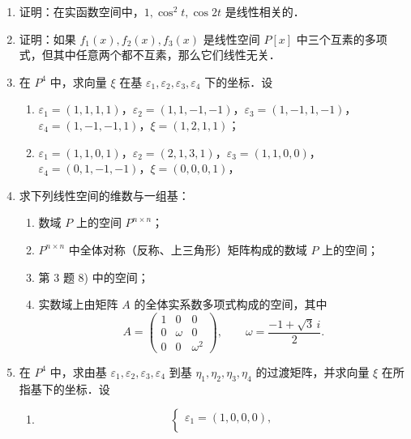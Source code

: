 \begin{enumerate}
  \begin{enumerate}
    \item $k0=0$；
  \anssub
    \item $k(\alpha-\beta)=k\alpha-k\beta$.
  \anssub
  \end{enumerate}
  \item 证明：在实函数空间中，$1,\cos^2 t,\cos 2t$ 是线性相关的．
  \ansproof
  \item 证明：如果 $f_1(x),f_2(x),f_3(x)$ 是线性空间 $P[x]$ 中三个互素的多项式，但其中任意两个都不互素，那么它们线性无关．
  \ansproof
  \item 在 $P^4$ 中，求向量 $\xi$ 在基 $\varepsilon_1,\varepsilon_2,\varepsilon_3,\varepsilon_4$ 下的坐标．设
  \begin{enumerate}
    \item $\varepsilon_1=(1,1,1,1)$，$\varepsilon_2=(1,1,-1,-1)$，$\varepsilon_3=(1,-1,1,-1)$，$\varepsilon_4=(1,-1,-1,1)$，$\xi=(1,2,1,1)$；
  \anssub
    \item $\varepsilon_1=(1,1,0,1)$，$\varepsilon_2=(2,1,3,1)$，$\varepsilon_3=(1,1,0,0)$，$\varepsilon_4=(0,1,-1,-1)$，$\xi=(0,0,0,1)$，
  \anssub
  \end{enumerate}
  \item 求下列线性空间的维数与一组基：
  \begin{enumerate}
    \item 数域 $P$ 上的空间 $P^{n\times n}$；
  \anssub
    \item $P^{n\times n}$ 中全体对称（反称、上三角形）矩阵构成的数域 $P$ 上的空间；
  \anssub
    \item 第 3 题 8) 中的空间；
  \anssub
    \item 实数域上由矩阵 $A$ 的全体实系数多项式构成的空间，其中
    \[
      A=\begin{pmatrix}
        1&0&0\\
        0&\omega&0\\
        0&0&\omega^2
      \end{pmatrix},
      \qquad
      \omega=\frac{-1+\sqrt{3}\,i}{2}.
    \]
  \anssub
  \end{enumerate}
  \item 在 $P^4$ 中，求由基 $\varepsilon_1,\varepsilon_2,\varepsilon_3,\varepsilon_4$ 到基 $\eta_1,\eta_2,\eta_3,\eta_4$ 的过渡矩阵，并求向量 $\xi$ 在所指基下的坐标．设
  \begin{enumerate}
    \item
    \[
      \begin{cases}
        \varepsilon_1=(1,0,0,0),\\

\end{cases}\]
\end{enumerate}
\end{enumerate}
